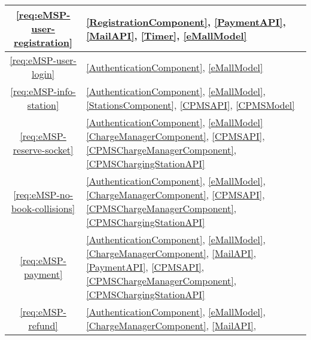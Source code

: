 \begin{table}[h]
      \begin{center}
            \begin{tabular}{|c||p{15.5cm}|}
                  \hline
                  \ref{req:eMSP-user-registration}     &
                  \ref{RegistrationComponent},
                  \ref{PaymentAPI},
                  \ref{MailAPI},
                  \ref{Timer},
                  \ref{eMallModel}
                  \\
                  \hline
                  \ref{req:eMSP-user-login}            &
                  \ref{AuthenticationComponent},
                  \ref{eMallModel}
                  \\
                  \hline
                  \ref{req:eMSP-info-station}          &
                  \ref{AuthenticationComponent},
                  \ref{eMallModel},
                  \ref{StationsComponent},
                  \ref{CPMSAPI},
                  \ref{CPMSModel}
                  \\
                  \hline
                  \ref{req:eMSP-reserve-socket}        &
                  \ref{AuthenticationComponent},
                  \ref{eMallModel}
                  \ref{ChargeManagerComponent},
                  \ref{CPMSAPI},
                  \ref{CPMSChargeManagerComponent},
                  \ref{CPMSChargingStationAPI}
                  \\
                  \hline
                  \ref{req:eMSP-no-book-collisions}    &
                  \ref{AuthenticationComponent},
                  \ref{eMallModel},
                  \ref{ChargeManagerComponent},
                  \ref{CPMSAPI},
                  \ref{CPMSChargeManagerComponent},
                  \ref{CPMSChargingStationAPI}
                  \\
                  \hline
                  \ref{req:eMSP-payment}               &
                  \ref{AuthenticationComponent},
                  \ref{eMallModel},
                  \ref{ChargeManagerComponent},
                  \ref{MailAPI},
                  \ref{PaymentAPI},
                  \ref{CPMSAPI},
                  \ref{CPMSChargeManagerComponent},
                  \ref{CPMSChargingStationAPI}
                  \\
                  \hline
                  \ref{req:eMSP-refund}                &
                  \ref{AuthenticationComponent},
                  \ref{eMallModel},
                  \ref{ChargeManagerComponent},
                  \ref{MailAPI},

\end{tabular}
\end{center}
\end{table}
